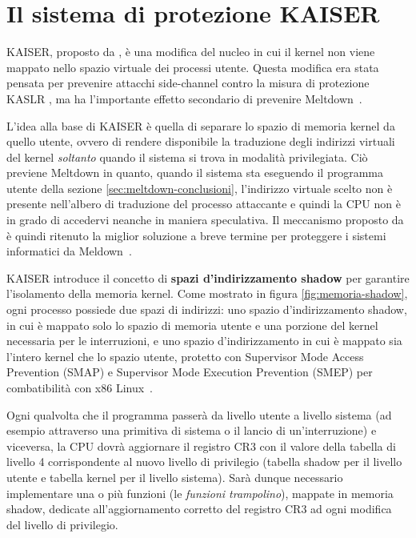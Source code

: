 \section{Il sistema di protezione KAISER}
KAISER, proposto da \textcite{gruss:kaslr}, è una modifica del nucleo in cui il kernel non viene mappato nello spazio virtuale dei processi utente.
Questa modifica era stata pensata per prevenire attacchi side-channel contro la misura di protezione KASLR \cite{hund:practical-timing-side-channel, gruss:prefetch-side-channel-attacks, jang:breaking-kaslr}, ma ha l'importante effetto secondario di prevenire Meltdown~\cite{lipp:meltdown}.

L'idea alla base di KAISER è quella di separare lo spazio di memoria kernel da quello utente, ovvero di rendere disponibile la traduzione degli indirizzi virtuali del kernel \emph{soltanto} quando il sistema si trova in modalità privilegiata.
Ciò previene Meltdown in quanto, quando il sistema sta eseguendo il programma utente della sezione \vref{sec:meltdown-conclusioni}, l'indirizzo virtuale scelto non è presente nell'albero di traduzione del processo attaccante e quindi la CPU non è in grado di accedervi neanche in maniera speculativa.
Il meccanismo proposto da \citeauthor{gruss:kaslr} è quindi ritenuto la miglior soluzione a breve termine per proteggere i sistemi informatici da Meldown~\cite{lipp:meltdown}.

KAISER introduce il concetto di \textbf{spazi d'indirizzamento shadow} per garantire l'isolamento della memoria kernel. 
Come mostrato in figura \vref{fig:memoria-shadow}, ogni processo possiede due spazi di indirizzi: uno spazio d'indirizzamento shadow, in cui è mappato solo lo spazio di memoria utente e una porzione del kernel necessaria per le interruzioni, e uno spazio d'indirizzamento in cui è mappato sia l'intero kernel che lo spazio utente, protetto con Supervisor Mode Access Prevention (SMAP) e Supervisor Mode Execution Prevention (SMEP) per combatibilità con x86 Linux~\cite{gruss:kaslr}.

Ogni qualvolta che il programma passerà da livello utente a livello sistema (ad esempio attraverso una primitiva di sistema o il lancio di un'interruzione) e viceversa, la CPU dovrà aggiornare il registro CR3 con il valore della tabella di livello 4 corrispondente al nuovo livello di privilegio (tabella shadow per il livello utente e tabella kernel per il livello sistema). 
Sarà dunque necessario implementare una o più funzioni (le \emph{funzioni trampolino}), mappate in memoria shadow, dedicate all'aggiornamento corretto del registro CR3 ad ogni modifica del livello di privilegio.

